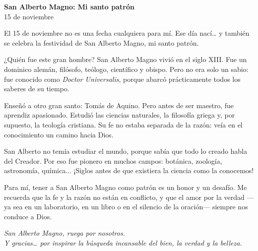 \documentclass[12pt]{article}
\begin{document}
	
	\begin{center}
		\LARGE \textbf{San Alberto Magno: Mi santo patrón} \\
		\vspace{0.5em}
		\large 15 de noviembre
	\end{center}
	
	\vspace{1em}
	
	\onehalfspacing
	
	El 15 de noviembre no es una fecha cualquiera para mí. Ese día nací… y también se celebra la festividad de San Alberto Magno, mi santo patrón.
	
	¿Quién fue este gran hombre? San Alberto Magno vivió en el siglo XIII. Fue un dominico alemán, filósofo, teólogo, científico y obispo. Pero no era solo un sabio: fue conocido como \textit{Doctor Universalis}, porque abarcó prácticamente todos los saberes de su tiempo.
	
	Enseñó a otro gran santo: Tomás de Aquino. Pero antes de ser maestro, fue aprendiz apasionado. Estudió las ciencias naturales, la filosofía griega y, por supuesto, la teología cristiana. Su fe no estaba separada de la razón: veía en el conocimiento un camino hacia Dios.
	
	San Alberto no temía estudiar el mundo, porque sabía que todo lo creado habla del Creador. Por eso fue pionero en muchos campos: botánica, zoología, astronomía, química... ¡Siglos antes de que existiera la ciencia como la conocemos!
	
	Para mí, tener a San Alberto Magno como patrón es un honor y un desafío. Me recuerda que la fe y la razón no están en conflicto, y que el amor por la verdad —ya sea en un laboratorio, en un libro o en el silencio de la oración— siempre nos conduce a Dios.
	
	\vspace{1em}
	
	\begin{center}
		\textit{San Alberto Magno, ruega por nosotros.} \\
		\textit{Y gracias… por inspirar la búsqueda incansable del bien, la verdad y la belleza.}
	\end{center}
	
\end{document}

